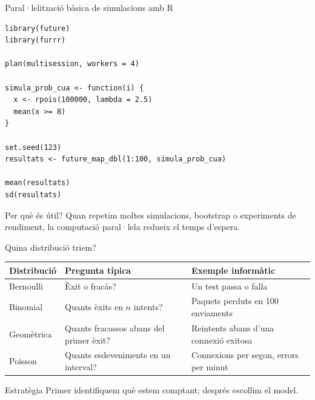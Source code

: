 \documentclass[10pt,aspectratio=169]{beamer}
\begin{document}
\begin{frame}[fragile]{Paral·lelització bàsica de simulacions amb R}
\begin{lstlisting}
library(future)
library(furrr)

plan(multisession, workers = 4)

simula_prob_cua <- function(i) {
  x <- rpois(100000, lambda = 2.5)
  mean(x >= 8)
}

set.seed(123)
resultats <- future_map_dbl(1:100, simula_prob_cua)

mean(resultats)
sd(resultats)
\end{lstlisting}

\begin{alertblock}{Per què és útil?}
Quan repetim moltes simulacions, bootstrap o experiments de rendiment, la computació paral·lela redueix el temps d'espera.
\end{alertblock}
\end{frame}

\begin{frame}{Quina distribució triem?}
\begin{center}
\begin{tabular}{p{3.2cm}p{4.1cm}p{4.4cm}}
\toprule
\textbf{Distribució} & \textbf{Pregunta típica} & \textbf{Exemple informàtic} \\
\midrule
Bernoulli & Èxit o fracàs? & Un test passa o falla \\
Binomial & Quants èxits en $n$ intents? & Paquets perduts en 100 enviaments \\
Geomètrica & Quants fracassos abans del primer èxit? & Reintents abans d'una connexió exitosa \\
Poisson & Quants esdeveniments en un interval? & Connexions per segon, errors per minut \\
\bottomrule
\end{tabular}
\end{center}
\vspace{0.2cm}
\begin{alertblock}{Estratègia}
Primer identifiquem què estem comptant; després escollim el model.
\end{alertblock}
\end{frame}
\end{document}
